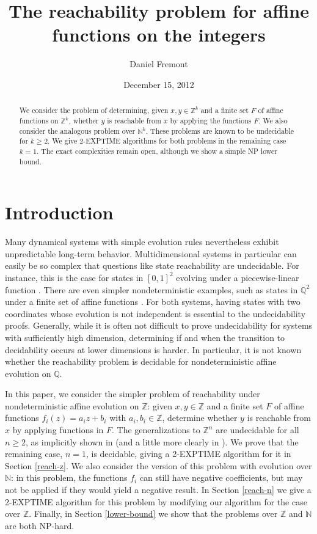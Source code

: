 \documentclass[11pt]{amsart}
\title{The reachability problem for affine functions on the integers}
\author{Daniel Fremont}
\date{December 15, 2012}
\newcommand{\Q}{\mathbb{Q}}
\newcommand{\N}{\mathbb{N}}
\newcommand{\Z}{\mathbb{Z}}
\theoremstyle{definition}
\theoremstyle{remark}
\begin{document}
\begin{abstract}
We consider the problem of determining, given $x, y \in \Z^k$ and a finite set $F$ of affine functions on $\Z^k$, whether $y$ is reachable from $x$ by applying the functions $F$. We also consider the analogous problem over $\N^k$. These problems are known to be undecidable  for $k \ge 2$. We give \textsf{2-EXPTIME} algorithms for both problems in the remaining case $k=1$. The exact complexities remain open, although we show a simple \textsf{NP} lower bound.
\end{abstract}

\maketitle

\section{Introduction}

Many dynamical systems with simple evolution rules nevertheless exhibit unpredictable long-term behavior. Multidimensional systems in particular can easily be so complex that questions like state reachability are undecidable. For instance, this is the case for states in $[0,1]^2$ evolving under a piecewise-linear function \cite{koiran}. There are even simpler nondeterministic examples, such as states in $\Q^2$ under a finite set of affine functions \cite{bell-potapov}. For both systems, having states with two coordinates whose evolution is not independent is essential to the undecidability proofs. Generally, while it is often not difficult to prove undecidability for systems with sufficiently high dimension, determining if and when the transition to decidability occurs at lower dimensions is harder. In particular, it is not known whether the reachability problem is decidable for nondeterministic affine evolution on $\Q$.

In this paper, we consider the simpler problem of reachability under nondeterministic affine evolution on $\Z$: given $x, y \in \Z$ and a finite set $F$ of affine functions $f_i(z) = a_i z + b_i$ with $a_i, b_i \in \Z$, determine whether $y$ is reachable from $x$ by applying functions in $F$. The generalizations to $\Z^n$ are undecidable for all $n \ge 2$, as implicitly shown in \cite{paterson} (and a little more clearly in \cite[Section 4.9]{gaubert-katz}). We prove that the remaining case, $n = 1$, is decidable, giving a \textsf{2-EXPTIME} algorithm for it in Section \ref{reach-z}. We also consider the version of this problem with evolution over $\N$: in this problem, the functions $f_i$ can still have negative coefficients, but may not be applied if they would yield a negative result. In Section \ref{reach-n} we give a \textsf{2-EXPTIME} algorithm for this problem by modifying our algorithm for the case over $\Z$. Finally, in Section \ref{lower-bound} we show that the problems over $\Z$ and $\N$ are both \textsf{NP}-hard.
\end{document}
